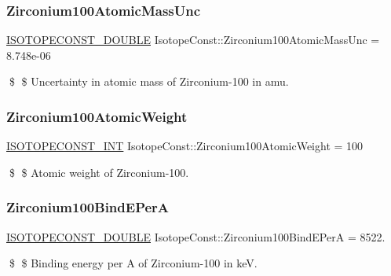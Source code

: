 \subsubsection{\texorpdfstring{Zirconium100\+Atomic\+Mass\+Unc}{Zirconium100AtomicMassUnc}}
{\footnotesize\ttfamily \mbox{\hyperlink{group___isotope_const-_macros_ga8f45a7272ce02c0b4c65c44636ed719a}{I\+S\+O\+T\+O\+P\+E\+C\+O\+N\+S\+T\+\_\+\+D\+O\+U\+B\+LE}} Isotope\+Const\+::\+Zirconium100\+Atomic\+Mass\+Unc = 8.\+748e-\/06}

\$ \$ Uncertainty in atomic mass of Zirconium-\/100 in amu. \mbox{\label{group___isotope_const-_zirconium-_zr100_ga6aa0f4b54be0607f5b46263c5e47464b}} 
\subsubsection{\texorpdfstring{Zirconium100\+Atomic\+Weight}{Zirconium100AtomicWeight}}
{\footnotesize\ttfamily \mbox{\hyperlink{group___isotope_const-_macros_ga5f18360b3e99483a35c32d789e62621c}{I\+S\+O\+T\+O\+P\+E\+C\+O\+N\+S\+T\+\_\+\+I\+NT}} Isotope\+Const\+::\+Zirconium100\+Atomic\+Weight = 100}

\$ \$ Atomic weight of Zirconium-\/100. \mbox{\label{group___isotope_const-_zirconium-_zr100_ga5afa768f3f16d8b3ca6c20490ee4ab28}} 
\subsubsection{\texorpdfstring{Zirconium100\+Bind\+E\+PerA}{Zirconium100BindEPerA}}
{\footnotesize\ttfamily \mbox{\hyperlink{group___isotope_const-_macros_ga8f45a7272ce02c0b4c65c44636ed719a}{I\+S\+O\+T\+O\+P\+E\+C\+O\+N\+S\+T\+\_\+\+D\+O\+U\+B\+LE}} Isotope\+Const\+::\+Zirconium100\+Bind\+E\+PerA = 8522.}

\$ \$ Binding energy per A of Zirconium-\/100 in keV. \mbox{\label{group___isotope_const-_zirconium-_zr100_gab5b2e4e04dcb098a2cdc9629d3e0e498}} 
